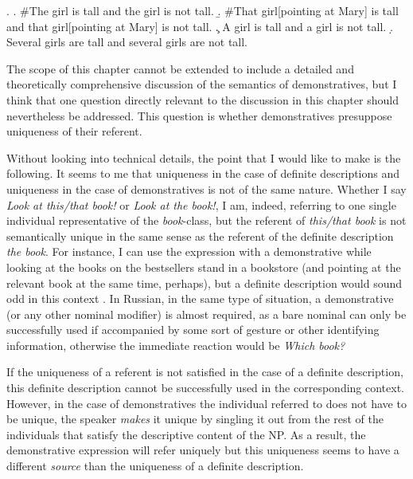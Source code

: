 \documentclass[output=paper,colorlinks,citecolor=brown]{langscibook}
\begin{document}
\ex. 
\a. 	$\#$The girl is tall and the girl is not tall.
\b. $\#$That girl[pointing at Mary] is tall and that girl[pointing at Mary] is not tall.
\c. A girl is tall and a girl is not tall.
\d.  Several girls are tall and several girls are not tall. 

\fi

The scope of this chapter cannot be extended to include a detailed and theoretically comprehensive discussion of the semantics of demonstratives, but I think that one question directly relevant to the discussion in this chapter should nevertheless be addressed. This question is whether demonstratives presuppose uniqueness of their referent. 

Without looking into technical details, the point that I would like to make is the following. It seems to me that uniqueness in the case of definite descriptions and uniqueness in the case of demonstratives is not of the same nature. Whether I say \textit{Look at this/that book!} or \textit{Look at the book!}, I am, indeed, referring to one single individual representative of the \textit{book}-class, but the referent of \textit{this/that book} is not semantically unique in the same sense as the referent of the definite description \textit{the book}. For instance, I can use the expression with a demonstrative while looking at the books on the bestsellers stand in a bookstore (and pointing at the relevant book at the same time, perhaps), but a definite description would sound odd in this context \citep[cf.][]{roberts02}. In Russian, in the same type of situation, a demonstrative (or any other nominal modifier) is almost required, as a bare nominal can only be successfully used if accompanied by some sort of gesture or other identifying information, otherwise the immediate reaction would be \textit{Which book?}

If the uniqueness of a referent is not satisfied in the case of a definite description, this definite description cannot be successfully used in the corresponding context. However, in the case of demonstratives the individual referred to does not have to be unique, the speaker \textit{makes} it unique by singling it out from the rest of the individuals that satisfy the descriptive content of the NP. As a result, the demonstrative expression will refer uniquely but this uniqueness seems to have a different \textit{source} than the uniqueness of a definite description. 
\end{document}
